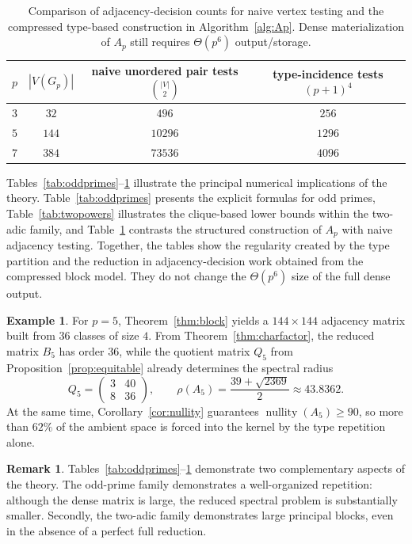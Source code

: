 \documentclass[12pt]{article}
\theoremstyle{definition}
\newtheorem{example}[theorem]{Example}
\newtheorem{remark}[theorem]{Remark}
\newcommand{\nullity}{\operatorname{nullity}}
\begin{document}
	\begin{table}[H]
		\centering
		\caption{Comparison of adjacency-decision counts for naive vertex testing and the compressed type-based construction in Algorithm~\ref{alg:Ap}. Dense materialization of $A_p$ still requires $\Theta(p^6)$ output/storage.}
		\label{tab:complexity}
		\begin{tabular}{cccc}
			\toprule
			$p$ & $|V(G_p)|$ & naive unordered pair tests $\binom{|V|}{2}$ & type-incidence tests $(p+1)^4$ \\
			\midrule
			$3$ & $32$ & $496$ & $256$ \\
			$5$ & $144$ & $10296$ & $1296$ \\
			$7$ & $384$ & $73536$ & $4096$ \\
			\bottomrule
		\end{tabular}
	\end{table}
	Tables~\ref{tab:oddprimes}--\ref{tab:complexity} illustrate the principal numerical implications of the theory. Table~\ref{tab:oddprimes} presents the explicit formulas for odd primes, Table~\ref{tab:twopowers} illustrates the clique-based lower bounds within the two-adic family, and Table~\ref{tab:complexity} contrasts the structured construction of $A_p$ with naive adjacency testing. Together, the tables show the regularity created by the type partition and the reduction in adjacency-decision work obtained from the compressed block model. They do not change the $\Theta(p^6)$ size of the full dense output.
	
	
	\begin{example}
		For $p=5$, Theorem~\ref{thm:block} yields a $144\times 144$ adjacency matrix built from $36$ classes of size $4$.  From Theorem~\ref{thm:charfactor}, the reduced matrix $B_5$ has order $36$, while the quotient matrix $Q_5$ from Proposition~\ref{prop:equitable} already determines the spectral radius
		$$
		Q_5=
		\begin{pmatrix}
			3 & 40\\
			8 & 36
		\end{pmatrix},
		\qquad
		\rho(A_5)=\frac{39+\sqrt{2369}}{2}\approx 43.8362.
		$$
		At the same time, Corollary~\ref{cor:nullity} guarantees $\nullity(A_5)\ge 90$, so more than $62\%$ of the ambient space is forced into the kernel by the type repetition alone.
	\end{example}
	
	\begin{remark}
		Tables~\ref{tab:oddprimes}--\ref{tab:complexity} demonstrate two complementary aspects of the theory. The odd-prime family demonstrates a well-organized repetition: although the dense matrix is large, the reduced spectral problem is substantially smaller. Secondly, the two-adic family demonstrates large principal blocks, even in the absence of a perfect full reduction.
	\end{remark}
	
\end{document}
